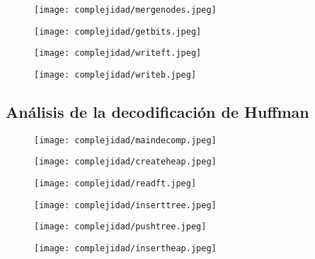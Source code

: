 \documentclass[12 pt]{report}
\begin{document}
\begin{figure}[h!]
  \texttt{[image: complejidad/mergenodes.jpeg]}
  \caption{\label{fig:Unir dos nodos a un ancestro comun} }
\end{figure}
\newpage
\begin{figure}[h!]
  \texttt{[image: complejidad/getbits.jpeg]}
  \caption{\label{fig:Obtener la codificación correspondiente} }
\end{figure}
\begin{figure}[h!]
  \texttt{[image: complejidad/writeft.jpeg]}
  \caption{\label{fig:Escribir la tabla de frecuencias} }
\end{figure}
\newpage
\begin{figure}[h!]
  \texttt{[image: complejidad/writeb.jpeg]}
  \caption{\label{fig:Escribir el archivo compreso} }
\end{figure}
\newpage
\subsection{Análisis de la decodificación de Huffman}
\begin{figure}[h!]
  \centering
  \texttt{[image: complejidad/maindecomp.jpeg]}
  \caption{\label{fig:Main de la decodificación} }
\end{figure}
\newpage

\begin{figure}[h!]
  \centering
  \texttt{[image: complejidad/createheap.jpeg]}
  \caption{\label{fig:Reservar el espacio del montículo} }
\end{figure}

\begin{figure}[h!]
  \centering
  \texttt{[image: complejidad/readft.jpeg]}
  \caption{\label{fig:Leer la tabla de frecuencias}}
\end{figure}
\newpage
\begin{figure}[h!]
  \centering
  \texttt{[image: complejidad/inserttree.jpeg]}
  \caption{\label{fig:Insertar nodos en la cola de prioridad} }
\end{figure}

\begin{figure}[h!]
  \centering
  \texttt{[image: complejidad/pushtree.jpeg]}
  \caption{\label{fig:Insertar datos en los nodos} }
\end{figure}

\begin{figure}[h!]
  \centering
  \texttt{[image: complejidad/insertheap.jpeg]}
  \caption{\label{fig:Insercion en la cola de prioridad} }
\end{figure}
\newpage
\end{document}
